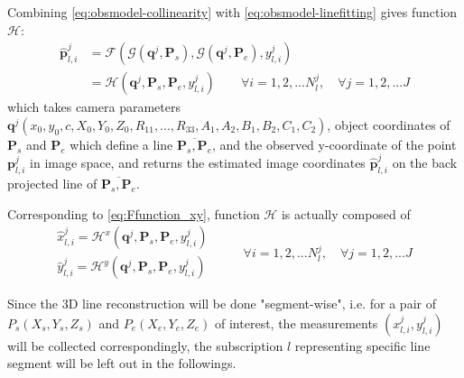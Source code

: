 Combining \eqref{eq:obsmodel-collinearity} with \eqref{eq:obsmodel-linefitting} gives function $\mathcal{H}$:
\begin{equation} \label{eq:Hfunction}
\begin{split}
\hat{\mathbf{p}}^j_{l,i} &= \mathcal{F}(\mathcal{G}(\mathbf{q}^j,\mathbf{P}_s),\mathcal{G}(\mathbf{q}^j,\mathbf{P}_e),y^j_{l,i})\\
&=\mathcal{H}(\mathbf{q}^j,\mathbf{P}_s,\mathbf{P}_e,y^j_{l,i})
\qquad
\forall i=1,2,...N^j_l,\quad\forall j=1,2,...J
\end{split}
\end{equation}
which takes camera parameters $\mathbf{q}^j(x_0,y_0,c,X_0,Y_0,Z_0,R_{11},...,R_{33},A_1,A_2,B_1,B_2,C_1,C_2)$, object coordinates of $\mathbf{P}_s$ and $\mathbf{P}_e$ which define a line $\overline{\mathbf{P}_s,\mathbf{P}_e}$, and the observed y-coordinate of the point $\mathbf{p}^j_{l,i}$ in image space, and returns the estimated image coordinates $\hat{\mathbf{p}}^j_{l,i}$ on the back projected line of $\overline{\mathbf{P}_s,\mathbf{P}_e}$.

Corresponding to \cref{eq:Ffunction_xy}, function $\mathcal{H}$ is actually composed of
\begin{equation} \label{eq:Hfunction_xy}
\begin{split}
\hat{x}^j_{l,i} = \mathcal{H}^x(\mathbf{q}^j,\mathbf{P}_s,\mathbf{P}_e,y^j_{l,i})\\
\hat{y}^j_{l,i} = \mathcal{H}^y(\mathbf{q}^j,\mathbf{P}_s,\mathbf{P}_e,y^j_{l,i})
\end{split}
\qquad
\begin{split}
\forall i=1,2,...N^j_l,\quad\forall j=1,2,...J
\end{split}
\end{equation}

Since the 3D line reconstruction will be done "segment-wise", i.e. for a pair of $P_s(X_s,Y_s,Z_s)$ and $P_e(X_e,Y_e,Z_e)$ of interest, the measurements $(x^j_{l,i},y^j_{l,i})$ will be collected correspondingly, the subscription $l$ representing specific line segment will be left out in the followings.

